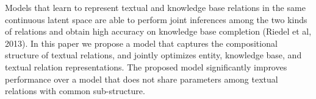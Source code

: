 Models that learn to represent textual and knowledge base relations in the same continuous latent space are able to perform joint inferences among the two kinds of relations and obtain high accuracy on knowledge base completion (Riedel et al, 2013). In this paper we propose a model that captures the compositional structure of textual relations, and jointly optimizes  entity, knowledge base, and textual relation representations.  The proposed model significantly improves performance over a model that does not share parameters among textual relations with common sub-structure.

